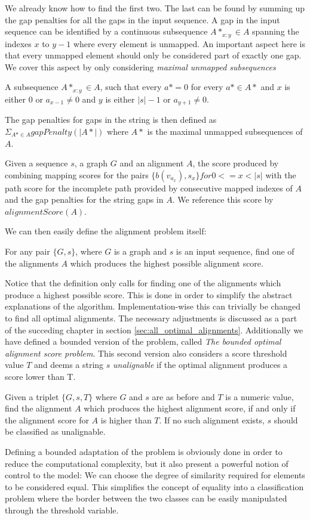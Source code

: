 \documentclass[thesis.tex]{subfiles}
\begin{document}
{\begin{enumerate}
\end{enumerate}
We already know how to find the first two. The last can be found by summing up the gap penalties for all the gaps in the input sequence. A gap in the input sequence can be identified by a continuous subsequence $A*_{x:y} \in A$ spanning the indexes $x$ to $y-1$ where every element is unmapped. An important aspect here is that every unmapped element should only be considered part of exactly one gap. We cover this aspect by only considering \textit{maximal unmapped subsequences}
\begin{defn}
  A subsequence $A*_{x:y} \in A$, such that every $a*=0$ for every $a* \in A*$ and $x$ is either $0$ or $a_{x-1} \neq 0$ and $y$ is either $|s|-1$ or $a_{y+1} \neq 0$.
\end{defn}
The gap penalties for gaps in the string is then defined as $\Sigma_{A* \in A} gapPenalty(|A*|)$ where $A*$ is the maximal unmapped subsequences of $A$.
\begin{defn}
  Given a sequence $s$, a graph $G$ and an alignment $A$, the score produced by combining mapping scores for the pairs $\{b(v_{a_x}), s_x\} for 0<=x<|s|$ with the path score for the incomplete path provided by consecutive mapped indexes of $A$ and the gap penalties for the string gaps in $A$. We reference this score by $alignmentScore(A)$.
\end{defn}
We can then easily define the alignment problem itself:
\begin{defn}
  For any pair $\{G, s\}$, where $G$ is a graph and $s$ is an input sequence, find one of the alignments $A$ which produces the highest possible alignment score.
\end{defn}
Notice that the definition only calls for finding one of the alignments which produce a highest possible score. This is done in order to simplify the abstract explanations of the algorithm. Implementation-wise this can trivially be changed to find all optimal alignments. The necessary adjustments is discussed as a part of the succeding chapter in section \ref{sec:all_optimal_alignments}. Additionally we have defined a bounded version of the problem, called \textit{The bounded optimal alignment score problem}. This second version also considers a score threshold value $T$ and deems a string $s$ \textit{unalignable} if the optimal alignment produces a score lower than T.
\begin{defn}
  \label{def:bounded_alignment_problem}
  Given a triplet $\{G, s, T\}$ where $G$ and $s$ are as before and $T$ is a numeric value, find the alignment $A$ which produces the highest alignment score, if and only if the alignment score for $A$ is higher than $T$. If no such alignment exists, $s$ should be classified as unalignable.
\end{defn}
Defining a bounded adaptation of the problem is obviously done in order to reduce the computational complexity, but it also present a powerful notion of control to the model: We can choose the degree of similarity required for elements to be considered equal. This simplifies the concept of equality into a classification problem where the border between the two classes can be easily manipulated through the threshold variable.
}
\end{document}
